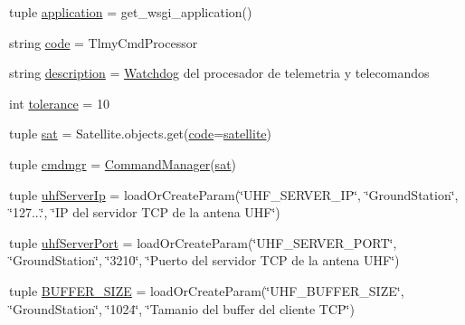 \begin{DoxyCompactItemize}
\item 
tuple \hyperlink{namespace_tlmy_cmd_processor_1_1_tlmy_cmd_processor_abc9fef542a08059c815604cf428eb8ea}{application} = get\+\_\+wsgi\+\_\+application()
\item 
string \hyperlink{namespace_tlmy_cmd_processor_1_1_tlmy_cmd_processor_a4b093dcc82bbec72c8869f3715934d92}{code} = \textquotesingle{}Tlmy\+Cmd\+Processor\textquotesingle{}
\item 
string \hyperlink{namespace_tlmy_cmd_processor_1_1_tlmy_cmd_processor_af826240cd995d7339c5f281ee8941333}{description} = \textquotesingle{}\hyperlink{class_ground_segment_1_1models_1_1_watchdog_1_1_watchdog}{Watchdog} del procesador de telemetria y telecomandos\textquotesingle{}
\item 
int \hyperlink{namespace_tlmy_cmd_processor_1_1_tlmy_cmd_processor_afb50f24734d74f88dacebcac995fd9f4}{tolerance} = 10
\item 
tuple \hyperlink{namespace_tlmy_cmd_processor_1_1_tlmy_cmd_processor_a9a28f85a45c8480187e9bc9812c9eff5}{sat} = Satellite.\+objects.\+get(\hyperlink{namespace_tlmy_cmd_processor_1_1_tlmy_cmd_processor_a4b093dcc82bbec72c8869f3715934d92}{code}=\hyperlink{namespace_tlmy_cmd_processor_1_1_tlmy_cmd_processor_a5cf95a9cff868554c46d7a901df74673}{satellite})
\item 
tuple \hyperlink{namespace_tlmy_cmd_processor_1_1_tlmy_cmd_processor_a4539a77a980ef2d5c22b5ed69ea58b9c}{cmdmgr} = \hyperlink{class_ground_segment_1_1_managers_1_1_command_manager_1_1_command_manager}{Command\+Manager}(\hyperlink{namespace_tlmy_cmd_processor_1_1_tlmy_cmd_processor_a9a28f85a45c8480187e9bc9812c9eff5}{sat})
\item 
tuple \hyperlink{namespace_tlmy_cmd_processor_1_1_tlmy_cmd_processor_ad1afaadb14f89dfd6adce55457a89fa4}{uhf\+Server\+Ip} = load\+Or\+Create\+Param(\char`\"{}U\+H\+F\+\_\+\+S\+E\+R\+V\+E\+R\+\_\+\+I\+P\char`\"{}, \char`\"{}Ground\+Station\char`\"{}, \char`\"{}127...\char`\"{}, \char`\"{}I\+P del servidor T\+C\+P de la antena U\+H\+F\char`\"{})
\item 
tuple \hyperlink{namespace_tlmy_cmd_processor_1_1_tlmy_cmd_processor_abc4f5193ae5293a175c24785f648c36f}{uhf\+Server\+Port} = load\+Or\+Create\+Param(\char`\"{}U\+H\+F\+\_\+\+S\+E\+R\+V\+E\+R\+\_\+\+P\+O\+R\+T\char`\"{}, \char`\"{}Ground\+Station\char`\"{}, \char`\"{}3210\char`\"{}, \char`\"{}Puerto del servidor T\+C\+P de la antena U\+H\+F\char`\"{})
\item 
tuple \hyperlink{namespace_tlmy_cmd_processor_1_1_tlmy_cmd_processor_ad6b870e079ada467cc4ac0b8f1f73039}{B\+U\+F\+F\+E\+R\+\_\+\+S\+I\+Z\+E} = load\+Or\+Create\+Param(\char`\"{}U\+H\+F\+\_\+\+B\+U\+F\+F\+E\+R\+\_\+\+S\+I\+Z\+E\char`\"{}, \char`\"{}Ground\+Station\char`\"{}, \char`\"{}1024\char`\"{}, \char`\"{}Tamanio del buffer del cliente T\+C\+P\char`\"{})

\end{DoxyCompactItemize}
